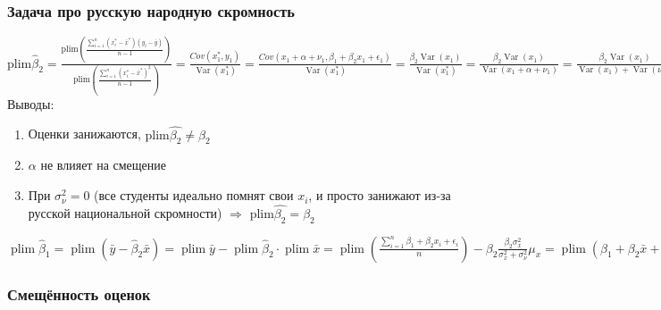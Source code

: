 \documentclass[10pt, a4paper]{extarticle}
\DeclareMathOperator{\plim}{plim}
\DeclareMathOperator{\Var}{Var}
\begin{document}
\subsubsection*{Задача про русскую народную скромность}
$\text{plim} \hat{\beta}_2 = \frac{\text{plim} \left( \frac{\sum_{i = 1}^n(x_i^* - \bar{x}^*)(y_i - \bar{y})}{n-1} \right)}{\text{plim} \left( \frac{\sum_{i = 1}^n(x_i^* - \bar{x}^*)^2}{n-1}\right)} = \frac{Cov(x_1^*, y_1)}{\Var(x_1^*)} = \frac{{Cov}(x_1 + \alpha + \nu_1, \beta_1 + \beta_2x_1 + \epsilon_1)}{\Var(x_1^*)} = \frac{\beta_2\Var(x_1)}{\Var(x_1^*)} = \frac{\beta_2\Var(x_1)}{\Var(x_1 + \alpha + \nu_1)} = \frac{\beta_2\Var(x_1)}{\Var(x_1) + \Var(\nu_1)} = \frac{\beta_2\sigma_x^2}{\sigma_x^2 + \sigma_\nu^2}$\\

Выводы:

\begin{enumerate}
	\item Оценки занижаются, $\text{plim} \hat{\beta_2} \neq \beta_2$
	\item $\alpha$  не влияет на смещение
	\item При $\sigma_\nu^2 = 0$ (все студенты идеально помнят свои $x_i$, и просто занижают из-за русской национальной скромности) $\Rightarrow$ $\text{plim}\hat{\beta_2} = \beta_2$
\end{enumerate}

$\plim \hat{\beta}_1 = \plim (\bar{y} - \hat{\beta}_2\bar{x}) = \plim \bar{y} - \plim \hat{\beta}_2 \cdot \plim \bar{x} = \plim \left( \frac{\sum_{i = 1}^n \beta_1 + \beta_2 x_i + \epsilon_i}{n} \right) - \beta_2 \frac{\beta_2\sigma_x^2}{\sigma_x^2 + \sigma_\nu^2} \mu_x = \plim (\beta_1 + \beta_2\bar{x} + \bar{\epsilon}) -  \beta_2 \frac{\beta_2\sigma_x^2}{\sigma_x^2 + \sigma_\nu^2} \mu_x  = \beta_1 + \beta_2 \mu_x -  \beta_2 \frac{\beta_2\sigma_x^2}{\sigma_x^2 + \sigma_\nu^2} \mu_x = \beta_1 + \frac{\beta_2 \mu_x (\sigma_x^2 + \sigma_v^2) - \beta \sigma_x^2 \mu_x}{\sigma_x^2 + \sigma_\nu^2} = \beta_1 + \frac{\beta_2 \mu_x \sigma_\nu^2}{\sigma_x^2 + \sigma_\nu^2}$

\subsubsection*{Смещённость оценок}
\end{document}
